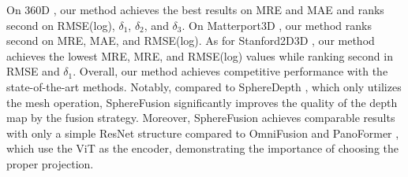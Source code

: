On 360D \cite{zioulis2018omnidepth}, our method achieves the best results on MRE and MAE and ranks second on RMSE(log), $\delta_1$, $\delta_2$, and $\delta_3$.
On Matterport3D \cite{chang2017matterport3d}, our method ranks second on MRE, MAE, and RMSE(log). 
As for Stanford2D3D \cite{armeni2017joint}, our method achieves the lowest MRE, MRE, and RMSE(log) values while ranking second in RMSE and $\delta_1$. 
Overall, our method achieves competitive performance with the state-of-the-art methods. 
Notably, compared to SphereDepth \cite{yan2022spheredepth}, which only utilizes the mesh operation, SphereFusion significantly improves the quality of the depth map by the fusion strategy.
Moreover, SphereFusion achieves comparable results with only a simple ResNet structure compared to OmniFusion \cite{li2022omnifusion} and PanoFormer \cite{shen2022panoformer}, which use the ViT as the encoder, demonstrating the importance of choosing the proper projection.


